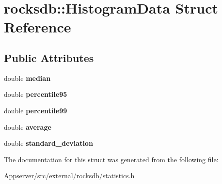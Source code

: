 \hypertarget{structrocksdb_1_1HistogramData}{}\section{rocksdb\+:\+:Histogram\+Data Struct Reference}
\label{structrocksdb_1_1HistogramData}
\subsection*{Public Attributes}
\begin{DoxyCompactItemize}
\item 
double {\bfseries median}\hypertarget{structrocksdb_1_1HistogramData_a1550daaf8c8e23493e878156d218eedc}{}\label{structrocksdb_1_1HistogramData_a1550daaf8c8e23493e878156d218eedc}

\item 
double {\bfseries percentile95}\hypertarget{structrocksdb_1_1HistogramData_ad0a5a78e6b21ea69d087f2068c5a8f4b}{}\label{structrocksdb_1_1HistogramData_ad0a5a78e6b21ea69d087f2068c5a8f4b}

\item 
double {\bfseries percentile99}\hypertarget{structrocksdb_1_1HistogramData_a3a70f47aa9eb5022599d29085115ed63}{}\label{structrocksdb_1_1HistogramData_a3a70f47aa9eb5022599d29085115ed63}

\item 
double {\bfseries average}\hypertarget{structrocksdb_1_1HistogramData_a72d69c156e94175aae46503bf59f4138}{}\label{structrocksdb_1_1HistogramData_a72d69c156e94175aae46503bf59f4138}

\item 
double {\bfseries standard\+\_\+deviation}\hypertarget{structrocksdb_1_1HistogramData_a3050a49db989753b4004fbdf089d1c52}{}\label{structrocksdb_1_1HistogramData_a3050a49db989753b4004fbdf089d1c52}

\end{DoxyCompactItemize}


The documentation for this struct was generated from the following file\+:\begin{DoxyCompactItemize}
\item 
Appserver/src/external/rocksdb/statistics.\+h\end{DoxyCompactItemize}
